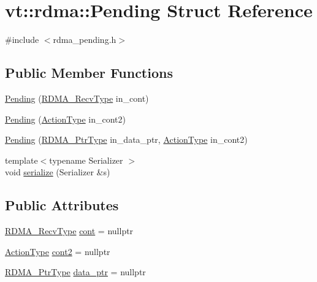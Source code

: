 \hypertarget{structvt_1_1rdma_1_1_pending}{}\section{vt\+:\+:rdma\+:\+:Pending Struct Reference}
\label{structvt_1_1rdma_1_1_pending}


{\ttfamily \#include $<$rdma\+\_\+pending.\+h$>$}

\subsection*{Public Member Functions}
\begin{DoxyCompactItemize}
\item 
\hyperlink{structvt_1_1rdma_1_1_pending_ab4ba68847f206e200ece5844f0bb6896}{Pending} (\hyperlink{namespacevt_1_1rdma_a36020f2b7ae371b6ddc8ec9caffb72d2}{R\+D\+M\+A\+\_\+\+Recv\+Type} in\+\_\+cont)
\item 
\hyperlink{structvt_1_1rdma_1_1_pending_a44bf0bdd07500e633545b82d8fb7bc35}{Pending} (\hyperlink{namespacevt_ae0a5a7b18cc99d7b732cb4d44f46b0f3}{Action\+Type} in\+\_\+cont2)
\item 
\hyperlink{structvt_1_1rdma_1_1_pending_ad14318ac7c35b7fc7ff8ec91b30004e5}{Pending} (\hyperlink{namespacevt_aab05b4a584f7ee835a6d0f66915cf59b}{R\+D\+M\+A\+\_\+\+Ptr\+Type} in\+\_\+data\+\_\+ptr, \hyperlink{namespacevt_ae0a5a7b18cc99d7b732cb4d44f46b0f3}{Action\+Type} in\+\_\+cont2)
\item 
{\footnotesize template$<$typename Serializer $>$ }\\void \hyperlink{structvt_1_1rdma_1_1_pending_a51e5a244bd917195174c58a076199c36}{serialize} (Serializer \&s)
\end{DoxyCompactItemize}
\subsection*{Public Attributes}
\begin{DoxyCompactItemize}
\item 
\hyperlink{namespacevt_1_1rdma_a36020f2b7ae371b6ddc8ec9caffb72d2}{R\+D\+M\+A\+\_\+\+Recv\+Type} \hyperlink{structvt_1_1rdma_1_1_pending_a379b732d7dfcd5fd42346c85583b8e08}{cont} = nullptr
\item 
\hyperlink{namespacevt_ae0a5a7b18cc99d7b732cb4d44f46b0f3}{Action\+Type} \hyperlink{structvt_1_1rdma_1_1_pending_a55d01ceada3293160e3167eb7194b9bd}{cont2} = nullptr
\item 
\hyperlink{namespacevt_aab05b4a584f7ee835a6d0f66915cf59b}{R\+D\+M\+A\+\_\+\+Ptr\+Type} \hyperlink{structvt_1_1rdma_1_1_pending_afcbb4951a3cfaa8981063487c0b90548}{data\+\_\+ptr} = nullptr
\end{DoxyCompactItemize}


